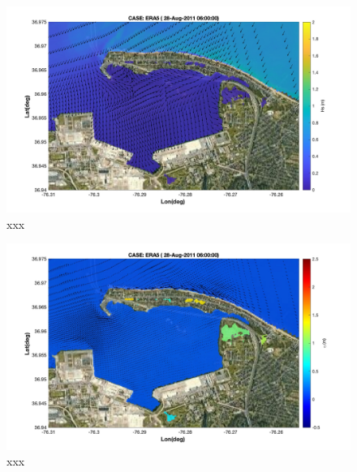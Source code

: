 \documentclass[preprint,12pt,authoryear]{elsarticle}
\begin{document}
\begin{figure}
\centering
\includegraphics[width=\textwidth]{./figures/nearcom_hs_ERA5_133.jpg}
\caption{xxx }
\label{boundary}
\centering
\end{figure}

\begin{figure}
\centering
\includegraphics[width=\textwidth]{./figures/nearcom_ele_ERA5_133.jpg}
\caption{xxx }
\label{boundary}
\centering
\end{figure}

\end{document}
